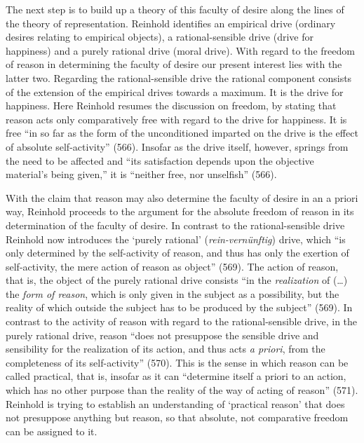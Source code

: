 The next step is to build up a theory of this faculty of desire along the lines of the theory of representation. Reinhold identifies an empirical drive (ordinary desires relating to empirical objects), a rational{-}sensible drive (drive for happiness) and a purely rational drive (moral drive). With regard to the freedom of reason in determining the faculty of desire our present interest lies with the latter two. Regarding the rational{-}sensible drive the rational component consists of the extension of the empirical drives towards a maximum. It is the drive for happiness. Here Reinhold resumes the discussion on freedom, by stating that reason acts only comparatively free with regard to the drive for happiness. It is free ``in so far as the form of the unconditioned imparted on the drive is the effect of absolute self{-}activity'' (566). Insofar as the drive itself, however, springs from the need to be affected and ``its satisfaction depends upon the objective material's being given,'' it is ``neither free, nor unselfish'' (566). 

With the claim that reason may also determine the faculty of desire in an a priori way, Reinhold proceeds to the argument for the absolute freedom of reason in its determination of the faculty of desire. In contrast to the rational{-}sensible drive Reinhold now introduces the `purely rational' (\textit{rein{-}vern\"{u}nftig}) drive, which ``is only determined by the self{-}activity of reason, and thus has only the exertion of self{-}activity, the mere action of reason as object'' (569). The action of reason, that is, the object of the purely rational drive consists ``in the \textit{realization} of (\ldots ) the \textit{form of reason}, which is only given in the subject as a possibility, but the reality of which outside the subject has to be produced by the subject'' (569). In contrast to the activity of reason with regard to the rational{-}sensible drive, in the purely rational drive, reason ``does not presuppose the sensible drive and sensibility for the realization of its action, and thus acts \textit{a priori}, from the completeness of its self{-}activity'' (570). This is the sense in which reason can be called practical, that is, insofar as it can ``determine itself a priori to an action, which has no other purpose than the reality of the way of acting of reason'' (571). Reinhold is trying to establish an understanding of `practical reason' that does not presuppose anything but reason, so that absolute, not comparative freedom can be assigned to it. 

